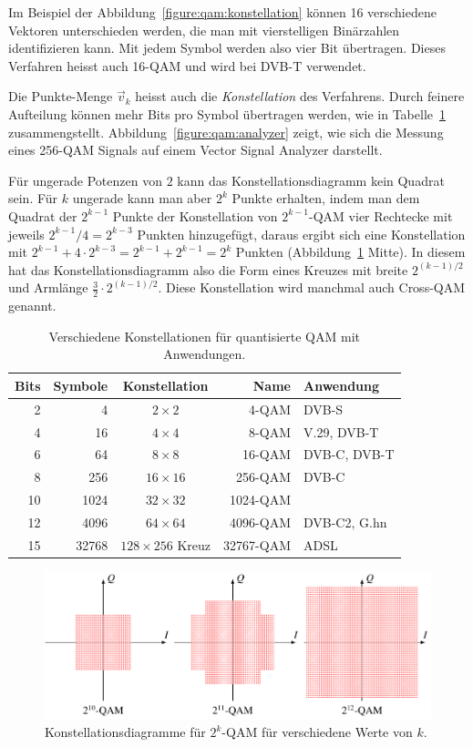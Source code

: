 Im Beispiel der Abbildung~\ref{figure:qam:konstellation} können 16 
verschiedene Vektoren unterschieden werden, die man mit vierstelligen
Binärzahlen identifizieren kann.
Mit jedem Symbol werden also vier Bit übertragen.
Dieses Verfahren heisst auch 16-QAM und wird bei DVB-T verwendet.

Die Punkte-Menge $\vec{v}_k$ heisst auch die {\em Konstellation}
des Verfahrens.
Durch feinere Aufteilung können mehr Bits pro Symbol übertragen werden,
wie in Tabelle~\ref{table:qam:xqam} zusammengstellt.
Abbildung~\ref{figure:qam:analyzer} zeigt, wie sich die Messung eines 256-QAM 
Signals auf einem Vector Signal Analyzer darstellt.

Für ungerade Potenzen von $2$ kann das Konstellationsdiagramm kein
Quadrat sein.
Für $k$ ungerade kann man aber $2^k$ Punkte erhalten, indem man
dem Quadrat der $2^{k-1}$ Punkte der Konstellation von $2^{k-1}$-QAM
vier Rechtecke mit jeweils $2^{k-1}/4=2^{k-3}$ Punkten hinzugefügt, daraus
ergibt sich eine Konstellation mit
$2^{k-1}+4\cdot 2^{k-3}=2^{k-1}+2^{k-1}=2^k$
Punkten (Abbildung~\ref{qam:figure:qam-konstellation} Mitte).
In diesem hat das Konstellationsdiagramm also die Form
eines Kreuzes mit breite $2^{(k-1)/2}$ und Armlänge
$\frac32\cdot 2^{(k-1)/2}$.
Diese Konstellation wird manchmal auch Cross-QAM genannt.

\begin{table}
\centering
\begin{tabular}{rrcrl}
\hline
Bits&Symbole&Konstellation&Name&Anwendung\\
\hline
   2&      4&$  2\times   2$      &    4-QAM&DVB-S       \\
   4&     16&$  4\times   4$      &    8-QAM&V.29, DVB-T \\
   6&     64&$  8\times   8$      &   16-QAM&DVB-C, DVB-T\\
   8&    256&$ 16\times  16$      &  256-QAM&DVB-C       \\
  10&   1024&$ 32\times  32$      & 1024-QAM&            \\
  12&   4096&$ 64\times  64$      & 4096-QAM&DVB-C2, G.hn\\
  15&  32768&$128\times 256$ Kreuz&32767-QAM&ADSL        \\
\hline
\end{tabular}
\caption{Verschiedene Konstellationen für quantisierte QAM mit Anwendungen.
\label{table:qam:xqam}}
\end{table}

\begin{figure}
\centering
\includegraphics{applications/qam/images/qam.pdf}
\caption{Konstellationsdiagramme für $2^k$-QAM für verschiedene Werte von $k$.
\label{qam:figure:qam-konstellation}}
\end{figure}

